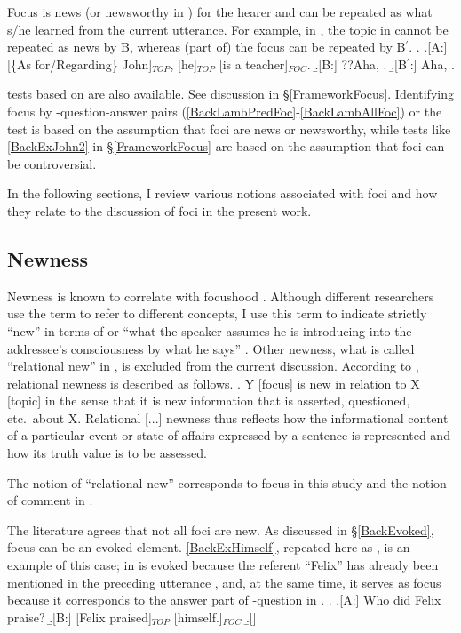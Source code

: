 Focus is news (or newsworthy in ) for the hearer and can be repeated as what s/he learned from the current utterance.
For example, in \Next,
the topic  in \Next[A] cannot be repeated as news by B,
whereas (part of) the focus  can be repeated by B$^{\prime}$.
%
\ex. \a.[A:] [\{As for/Regarding\} John]$_{TOP}$, [he]$_{TOP}$ [is a teacher]$_{FOC}$.
     \b.[B:] ??Aha, .
     \b.[B$^{\prime}$:] Aha, .

 tests based on  are also available.
See discussion in \S \ref{FrameworkFocus}.
Identifying focus by
-question-answer pairs (\ref{BackLambPredFoc}-\ref{BackLambAllFoc}) or the  test \Last
is based on the assumption that
foci are news or newsworthy,
while  tests like \ref{BackExJohn2} in \S \ref{FrameworkFocus} are based on the assumption that
foci can be controversial.

In the following sections,
I review various notions associated with foci
and how they relate to the discussion of foci in the present work.

\subsection{Newness}

Newness is known to correlate with focushood \cite[]{li76,givon83,halliday04}.
Although different researchers use the term  to refer to different concepts,
I use this term to indicate strictly ``new'' in terms of  or ``what the speaker assumes he is introducing into the addressee's consciousness by what he says'' \cite[30]{chafe76}.
Other newness, what is called ``relational new'' in ,
is excluded from the current discussion.
According to , relational newness is described as follows.
%
\ex. Y [focus] is new in relation to X [topic] in the sense that
     it is new information that is asserted, questioned, etc.~about X.
     Relational [...] newness thus reflects how the informational content of a particular event or state of affairs expressed by a sentence is represented and how its truth value is to be assessed.

The notion of ``relational new'' corresponds to focus in this study and the notion of comment in .


The literature agrees that
not all foci are new.
As discussed in \S \ref{BackEvoked},
focus can be an evoked element.
\ref{BackExHimself}, repeated here as \Next,
is an example of this case;
 in \Next[B] is evoked because the referent ``Felix'' has already been mentioned in the preceding utterance \Next[A],
and, at the same time, it serves as focus because it corresponds to the answer part of -question in \Next[A].
%
\ex. \a.[A:] Who did Felix praise?
     \b.[B:] [Felix praised]$_{TOP}$ [himself.]$_{FOC}$
     \b.[] \hfill{\cite[72, style modified by NN]{reinhart81}}


